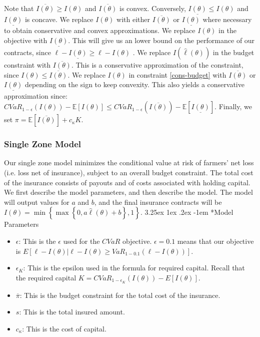 \documentclass[11pt]{article}
\makeatletter
\renewcommand\paragraph{\@startsection{paragraph}{5}{\z@}%
  {3.25ex \@plus1ex \@minus.2ex}%
  {-1em}%
  {\normalfont\normalsize\bfseries}}
\makeatother
\begin{document}
        Note that $\overline{I(\theta)} \geq I(\theta)$ and $\overline{I(\theta)}$ is convex. Conversely, $\underline{I(\theta)} \leq I(\theta)$ and $\underline{I(\theta)}$ is concave. We replace $I(\theta)$ with either $\overline{I(\theta)}$ or $\underline{I(\theta)}$ where necessary to obtain conservative and convex approximations. We replace $I(\theta)$ in the objective with $\underline{I(\theta)}$. This will give us an lower bound on the performance of our contracts, since $\ell - \underline{I(\theta)} \geq  \ell - I(\theta)$ . We replace $I(\hat{\ell}(\theta))$ in the budget constraint with $\overline{I(\theta)}$. This is a conservative approximation of the constraint, since $I(\theta)  \leq \overline{I(\theta)}$. We replace $I(\theta)$ in constraint \ref{cons-budget} with $\overline{I(\theta)}$ or $\underline{I(\theta)}$ depending on the sign to keep convexity. This also yields a conservative approximation since: $CVaR_{1-\epsilon}\left ( I(\theta) \right )  - \mathbb{E}[I(\theta)]  \leq CVaR_{1-\epsilon}\left ( \overline{I(\theta)} \right )  - \mathbb{E}[ \underline{I(\theta) }]$. Finally, we set $\pi = \mathbb{E}\left [ \overline{ I(\theta)} \right ] + c_{\kappa} K$.
    
    \subsubsection{Single Zone Model}
        Our single zone model minimizes the conditional value at risk of farmers' net loss (i.e. loss net of insurance), subject to an overall budget constraint. The total cost of the insurance consists of payouts and of costs associated with holding capital. We first describe the model parameters, and then describe the model. The model will output values for $a$ and $b$, and the final insurance contracts will be $I(\theta) = \min \left \{\max \left \{0,a\hat{\ell}(\theta) + b \right \}, 1 \right \}$.
    \paragraph*{Model Parameters}
        \begin{itemize}
            \item $\epsilon$: This is the $\epsilon$ used for the $CVaR$ objective.  $\epsilon = 0.1$ means that our objective is $E[\ell - I(\theta)|\ell -I(\theta) \geq VaR_{1-0.1}\left ( \ell - I(\theta) \right )]$. 
            \item $\epsilon_K$: This is the epsilon used in the formula for required capital. Recall that the required capital $K = CVaR_{1-\epsilon_K}(I(\theta)) - E[I(\theta)]$.
            \item $\overline{\pi}$: This is the budget constraint for the total cost of the insurance. 
            \item $s$: This is the total insured amount.
            \item $c_{\kappa}$: This is the cost of capital. 
        \end{itemize}
    
\end{document}
